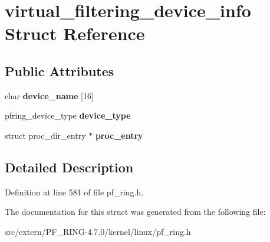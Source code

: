 \hypertarget{structvirtual__filtering__device__info}{
\section{virtual\_\-filtering\_\-device\_\-info Struct Reference}
\label{structvirtual__filtering__device__info}
}
\subsection*{Public Attributes}
\begin{DoxyCompactItemize}
\item 
\hypertarget{structvirtual__filtering__device__info_a9d85874ed906575ecbb4d7e5d9cf50cb}{
char {\bfseries device\_\-name} \mbox{[}16\mbox{]}}
\label{structvirtual__filtering__device__info_a9d85874ed906575ecbb4d7e5d9cf50cb}

\item 
\hypertarget{structvirtual__filtering__device__info_a2d3e2ee8cbacd32d11a927389222dbbe}{
pfring\_\-device\_\-type {\bfseries device\_\-type}}
\label{structvirtual__filtering__device__info_a2d3e2ee8cbacd32d11a927389222dbbe}

\item 
\hypertarget{structvirtual__filtering__device__info_a47d1fe87797dfb668122bf013dc11ea4}{
struct proc\_\-dir\_\-entry $\ast$ {\bfseries proc\_\-entry}}
\label{structvirtual__filtering__device__info_a47d1fe87797dfb668122bf013dc11ea4}

\end{DoxyCompactItemize}


\subsection{Detailed Description}


Definition at line 581 of file pf\_\-ring.h.



The documentation for this struct was generated from the following file:\begin{DoxyCompactItemize}
\item 
src/extern/PF\_\-RING-\/4.7.0/kernel/linux/pf\_\-ring.h\end{DoxyCompactItemize}
